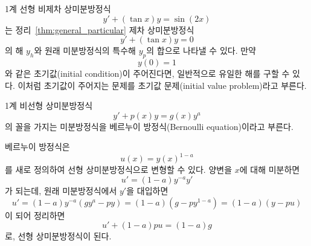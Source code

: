 \documentclass[../engineering_mathematics_lecture_note.tex]{subfiles}
\begin{document}
\begin{example}
    1계 선형 비제차 상미분방정식
    \begin{equation*}
        y' + (\tan x) y = \sin(2x)
    \end{equation*}
    는 정리~\ref{thm:general_particular} 제차 상미분방정식
    \begin{equation*}
        y' + (\tan x) y = 0
    \end{equation*}
    의 해 $y_h$와 원래 미분방정식의 특수해 $y_p$의 합으로 나타낼 수 있다.
    만약
    \begin{equation*}
        y(0) = 1
    \end{equation*}
    와 같은 초기값(initial condition)이 주어진다면, 일반적으로 유일한 해를 구할 수 있다.
    이처럼 초기값이 주어지는 문제를 초기값 문제(initial value problem)라고 부른다.
\end{example}

\begin{definition}
    1계 비선형 상미분방정식
    \begin{equation*}
        y' + p(x) y = g(x) y^a
    \end{equation*}
    의 꼴을 가지는 미분방정식을 베르누이 방정식(Bernoulli equation)이라고 부른다.
\end{definition}

베르누이 방정식은
\begin{equation*}
    u(x) = y(x)^{1 - a}
\end{equation*}
를 새로 정의하여 선형 상미분방정식으로 변형할 수 있다.
양변을 $x$에 대해 미분하면
\begin{equation*}
    u' = (1 - a) y^{-a} y'
\end{equation*}
가 되는데, 원래 미분방정식에서 $y'$을 대입하면
\begin{equation*}
    u' = (1 - a) y^{-a} (gy^a - py) = (1 - a) \left(g - py^{1 - a}\right) = (1 - a) (y - pu)
\end{equation*}
이 되어 정리하면
\begin{equation*}
    u' + (1 - a)pu = (1 - a)g
\end{equation*}
로, 선형 상미분방정식이 된다.
\end{document}
